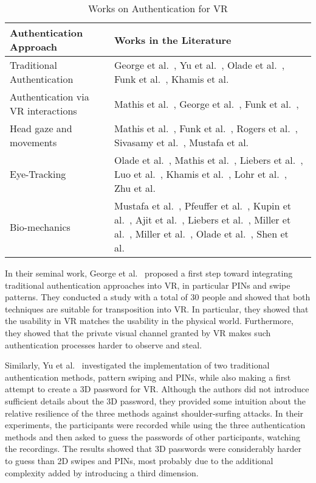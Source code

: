 \documentclass[journal]{IEEEtran}
\begin{document}
\begin{table*}[t]
\centering
\normalsize
\renewcommand\arraystretch{1.4}
\caption{Works on Authentication for VR}
\label{tab:auth}
\begin{tabularx}{0.95\textwidth}{L{0.5}A}
\textbf{Authentication Approach} & \textbf{Works in the Literature} \\ \toprule
Traditional Authentication & George et al.~\cite{george2017seamless}, Yu et al.~\cite{yu2016}, Olade et al.~\cite{olade2020swipe}, Funk et al.~\cite{funk2019}, Khamis et al.~\cite{khamis2018}\\
Authentication via VR interactions  & Mathis et al.~\cite{mathis2020,mathis2021}, George et al.~\cite{george2019}, Funk et al.~\cite{funk2019}, \\
Head gaze and movements & Mathis et al.~\cite{mathis2020,mathis2021}, Funk et al.~\cite{funk2019}, Rogers et al.~\cite{rogers2015}, Sivasamy et al.~\cite{sivasamy2020}, Mustafa et al.~\cite{mustafa2018} \\
Eye-Tracking & Olade et al.~\cite{olade2020swipe}, Mathis et al.~\cite{mathis2020,mathis2021}, Liebers et al.~\cite{liebers2021gaze}, Luo et al.~\cite{luo2020}, Khamis et al.~\cite{khamis2018}, Lohr et al.~\cite{lohr2018,lohr2020}, Zhu et al.~\cite{zhu2020}\\
Bio-mechanics & Mustafa et al.~\cite{mustafa2018}, Pfeuffer et al.~\cite{pfeuffer2019}, Kupin et al.~\cite{kupin2019}, Ajit et al.~\cite{ajit2019}, Liebers et al.~\cite{liebers2021}, Miller et al.~\cite{miller2020}, Miller et al.~\cite{miller2021}, Olade et al.~\cite{olade2020biomove}, Shen et al.~\cite{shen2018} \\
\bottomrule
\end{tabularx}
\end{table*}


In their seminal work, George et al.~\cite{george2017seamless} proposed a first step toward integrating traditional authentication approaches into VR, in particular PINs and swipe patterns. They conducted a study with a total of 30 people and showed that both techniques are suitable for transposition into VR. In particular, they showed that the usability in VR matches the usability in the physical world. Furthermore, they showed that the private visual channel granted by VR makes such authentication processes harder to observe and steal.

Similarly, Yu et al.~\cite{yu2016} investigated the implementation of two traditional authentication methods, pattern swiping and PINs, while also making a first attempt to create a 3D password for VR. Although the authors did not introduce sufficient details about the 3D password, they provided some intuition about the relative resilience of the three methods against shoulder-surfing attacks. In their experiments, the participants were recorded while using the three authentication methods and then asked to guess the passwords of other participants, watching the recordings. The results showed that 3D passwords were considerably harder to guess than 2D swipes and PINs, most probably due to the additional complexity added by introducing a third dimension.
\end{document}
